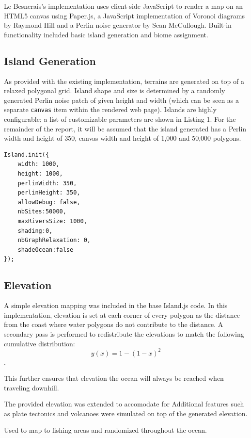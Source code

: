 Le Besnerais's implementation uses client-side JavaScript to render a map on an HTML5 canvas using Paper.js\cite{Lehni:2015:Online}, a JavaScript implementation of Voronoi diagrams by Raymond Hill \cite{Hill:2015:Online} and a Perlin noise generator by Sean McCullough\cite{McCullough:2015:Online}. Built-in functionality included basic island generation and biome assignment.

\subsection{Island Generation}
As provided with the existing implementation, terrains are generated on top of a relaxed polygonal grid. Island shape and size is determined by a randomly generated Perlin noise patch of given height and width (which can be seen as a separate \texttt{canvas} item within the rendered web page). Islands are highly configurable; a list of customizable parameters are shown in Listing 1. For the remainder of the report, it will be assumed that the island generated has a Perlin width and height of 350, canvas width and height of 1,000 and 50,000 polygons.

\begin{lstlisting}[caption=Island Parameters]
Island.init({
	width: 1000,
	height: 1000,
    perlinWidth: 350,
    perlinHeight: 350,
    allowDebug: false,
    nbSites:50000,
    maxRiversSize: 1000,
    shading:0,
    nbGraphRelaxation: 0,
    shadeOcean:false
});
\end{lstlisting}

\subsection{Elevation}
A simple elevation mapping was included in the base Island.js code. In this implementation, elevation is set at each corner of every polygon as the distance from the coast where water polygons do not contribute to the distance. A secondary pass is performed to redistribute the elevations to match the following cumulative distribution: $$y(x) = 1 - (1-x)^2$$.

This further ensures that elevation the ocean will always be reached when traveling downhill.

The provided elevation was extended to accomodate for
Additional features such as plate tectonics and volcanoes were simulated on top of the generated elevation.

Used to map to fishing areas and randomized throughout the ocean.

